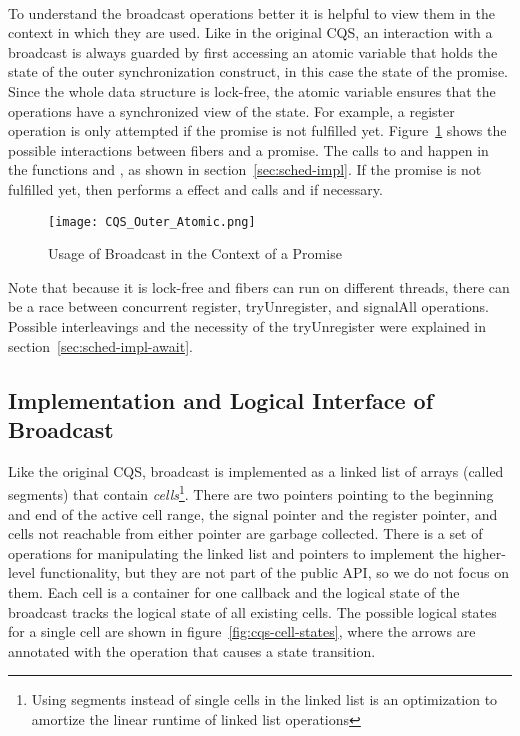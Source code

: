 \paragraph*{}
To understand the broadcast operations better it is helpful to view them in the context in which they are used.
Like in the original CQS, an interaction with a broadcast is always guarded by first accessing an atomic variable that holds the state of the outer synchronization construct, in this case the state of the promise.
Since the whole data structure is lock-free, the atomic variable ensures that the operations have a synchronized view of the state.
For example, a register operation is only attempted if the promise is not fulfilled yet.
Figure~\ref{fig:cqs-usage} shows the possible interactions between fibers and a promise.
The calls to  and  happen in the functions  and , as shown in section~\ref{sec:sched-impl}.
If the promise is not fulfilled yet,  then performs a \esuspend{} effect and calls  and  if necessary.

\begin{figure}[ht]
  \texttt{[image: CQS\_Outer\_Atomic.png]}
  \caption{Usage of Broadcast in the Context of a Promise}
  \label{fig:cqs-usage}
\end{figure}

Note that because it is lock-free and fibers can run on different threads, there can be a race between concurrent register, tryUnregister, and signalAll operations.
Possible interleavings and the necessity of the tryUnregister were explained in section~\ref{sec:sched-impl-await}.

\subsection{Implementation and Logical Interface of Broadcast}
\label{sec:broadcast-impl}


Like the original CQS, broadcast is implemented as a linked list of arrays (called segments) that contain \emph{cells}\footnote{Using segments instead of single cells in the linked list is an optimization to amortize the linear runtime of linked list operations}.
There are two pointers pointing to the beginning and end of the active cell range, the signal pointer and the register pointer, and cells not reachable from either pointer are garbage collected.
There is a set of operations for manipulating the linked list and pointers to implement the higher-level functionality, but they are not part of the public API, so we do not focus on them.
Each cell is a container for one callback and the logical state of the broadcast tracks the logical state of all existing cells.
The possible logical states for a single cell are shown in figure~\ref{fig:cqs-cell-states}, where the arrows are annotated with the operation that causes a state transition.

